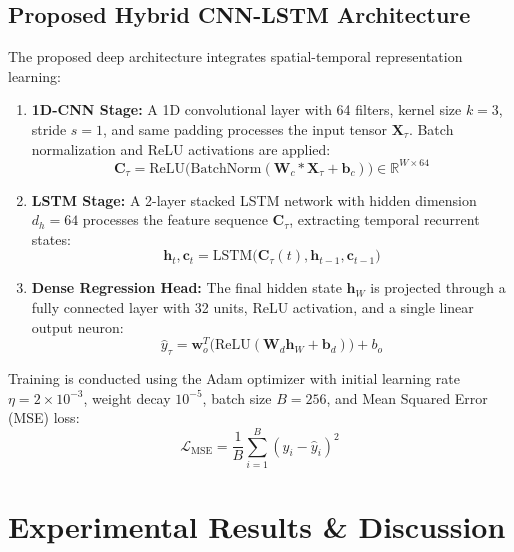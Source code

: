 \documentclass[conference]{IEEEtran}
\begin{document}
\subsection{Proposed Hybrid CNN-LSTM Architecture}
The proposed deep architecture integrates spatial-temporal representation learning:
\begin{enumerate}
    \item \textbf{1D-CNN Stage:} A 1D convolutional layer with 64 filters, kernel size $k=3$, stride $s=1$, and same padding processes the input tensor $\mathbf{X}_\tau$. Batch normalization and ReLU activations are applied:
    \begin{equation}
    \mathbf{C}_\tau = \text{ReLU}\big(\text{BatchNorm}(\mathbf{W}_c * \mathbf{X}_\tau + \mathbf{b}_c)\big) \in \mathbb{R}^{W \times 64}
    \end{equation}
    \item \textbf{LSTM Stage:} A 2-layer stacked LSTM network with hidden dimension $d_h=64$ processes the feature sequence $\mathbf{C}_\tau$, extracting temporal recurrent states:
    \begin{equation}
    \mathbf{h}_t, \mathbf{c}_t = \text{LSTM}\big(\mathbf{C}_\tau(t), \mathbf{h}_{t-1}, \mathbf{c}_{t-1}\big)
    \end{equation}
    \item \textbf{Dense Regression Head:} The final hidden state $\mathbf{h}_W$ is projected through a fully connected layer with 32 units, ReLU activation, and a single linear output neuron:
    \begin{equation}
    \hat{y}_\tau = \mathbf{w}_o^T\big(\text{ReLU}(\mathbf{W}_d \mathbf{h}_W + \mathbf{b}_d)\big) + b_o
    \end{equation}
\end{enumerate}

Training is conducted using the Adam optimizer with initial learning rate $\eta = 2\times 10^{-3}$, weight decay $10^{-5}$, batch size $B=256$, and Mean Squared Error (MSE) loss:
\begin{equation}
\mathcal{L}_{\text{MSE}} = \frac{1}{B}\sum_{i=1}^{B}\left(y_i - \hat{y}_i\right)^2
\end{equation}

\section{Experimental Results \& Discussion}
\end{document}
